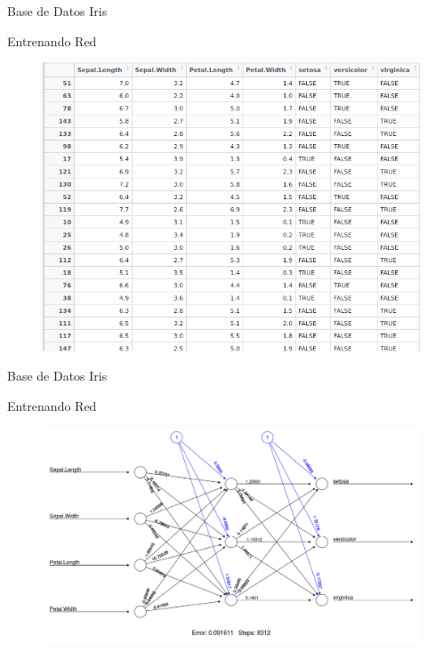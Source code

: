 \documentclass{beamer}
\begin{document}
\begin{frame}{Base de Datos Iris}
\begin{block}{Entrenando Red}
\begin{figure}
\includegraphics[scale=0.3]{irisfalsetrue.png}
\centering
\end{figure}
\end{block}
\end{frame}

\begin{frame}{Base de Datos Iris}
\begin{block}{Entrenando Red}
\begin{figure}
\includegraphics[scale=0.25]{entrenadairis.png}
\centering
\end{figure}
\end{block}
\end{frame}
\end{document}
